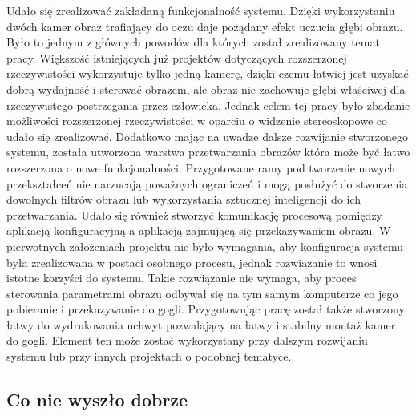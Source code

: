 \documentclass[a4paper,11pt,twoside]{report}
\theoremstyle{definition}
\begin{document}
Udało się zrealizować zakładaną funkcjonalność systemu. Dzięki wykorzystaniu dwóch kamer obraz trafiający do oczu daje pożądany efekt uczucia głębi obrazu. Było to jednym z głównych powodów dla których został zrealizowany temat pracy. Większość istniejących już projektów dotyczących rozszerzonej rzeczywistości wykorzystuje tylko jedną kamerę, dzięki czemu łatwiej jest uzyskać dobrą wydajność i sterować obrazem, ale obraz nie zachowuje głębi właściwej dla rzeczywistego postrzegania przez człowieka. Jednak celem tej pracy było zbadanie możliwości rozszerzonej rzeczywistości w oparciu o widzenie stereoskopowe co udało się zrealizować. Dodatkowo mając na uwadze dalsze rozwijanie stworzonego systemu, została utworzona warstwa przetwarzania obrazów która może być łatwo rozszerzona o nowe funkcjonalności. Przygotowane ramy pod tworzenie nowych przekształceń nie narzucają poważnych ograniczeń i mogą posłużyć do stworzenia dowolnych filtrów obrazu lub wykorzystania sztucznej inteligencji do ich przetwarzania. Udało się również stworzyć komunikację procesową pomiędzy aplikacją konfiguracyjną a aplikacją zajmującą się przekazywaniem obrazu. W pierwotnych założeniach projektu nie było wymagania, aby konfiguracja systemu była zrealizowana w postaci osobnego procesu, jednak rozwiązanie to wnosi istotne korzyści do systemu. Takie rozwiązanie nie wymaga, aby proces sterowania parametrami obrazu odbywał się na tym samym komputerze co jego pobieranie i przekazywanie do gogli. Przygotowując pracę został także stworzony łatwy do wydrukowania uchwyt pozwalający na łatwy i stabilny montaż kamer do gogli. Element ten może zostać wykorzystany przy dalszym rozwijaniu systemu lub przy innych projektach o podobnej tematyce.

\subsection{Co nie wyszło dobrze}
\end{document}

